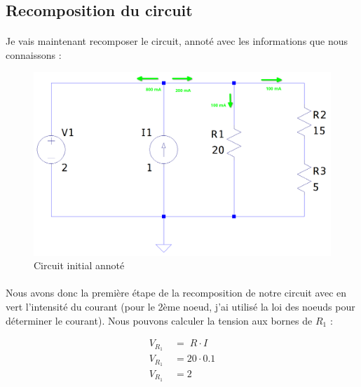 \subsection{Recomposition du circuit}

    \paragraph{}Je vais maintenant recomposer le circuit, annoté avec les informations que nous connaissons :


    \begin{figure}[H]
        \centering
        \includegraphics[width=\textwidth]{../pictures/recompose.png} %
        \caption{Circuit initial annoté}
    \end{figure}


    \paragraph{}Nous avons donc la première étape de la recomposition de notre circuit avec en vert l'intensité du courant
    (pour le 2ème noeud, j'ai utilisé la loi des noeuds pour déterminer le courant). Nous pouvons calculer la tension aux
    bornes de $R_1$ :

        {\color{info}\begin{align*}
            V_{R_{1}}\;&=\;R \cdot I \\
            V_{R_{1}}\;&=20 \cdot 0.1 \\
            V_{R_{1}}\;&=2
        \end{align*}}
        

